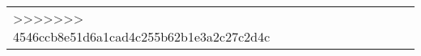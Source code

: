 \begin{landscape}
\begin{table}[htbp]
{\begin{tabular}{|Z{\centering}{m}{4cm}||Z{\centering}{m}{5cm}|Z{\centering}{m}{5cm}|Z{\centering}{m}{3cm}|Z{\centering}{m}{4cm}|Z{\centering}{m}{5cm}|}
    
>>>>>>> 4546ccb8e51d6a1cad4c255b62b1e3a2c27c2d4c
   \end{tabular}}%
  \label{tab:pt2}%
\end{table}%
\end{landscape}
